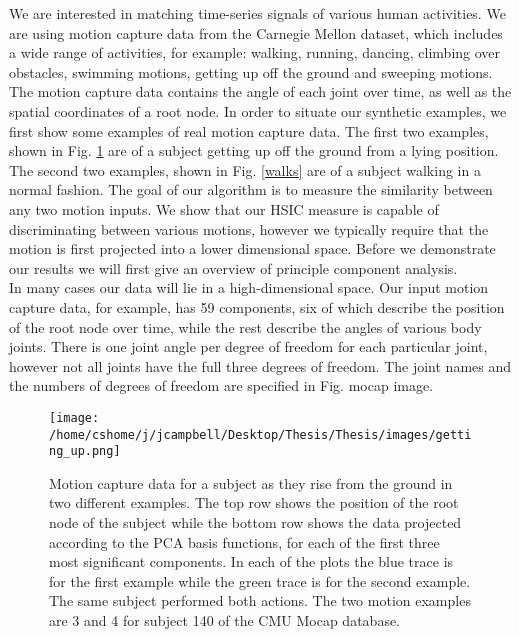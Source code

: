 We are interested in matching time-series signals of various human activities. We are using motion capture data from the Carnegie Mellon dataset, which includes a wide range of activities, for example: walking, running, dancing, climbing over obstacles, swimming motions, getting up off the ground and sweeping motions. The motion capture data contains the angle of each joint over time, as well as the spatial coordinates of a root node. In order to situate our synthetic examples, we first show some examples of real motion capture data. The first two examples, shown in Fig. \ref{getting_up} are of a subject getting up off the ground from a lying position. The second two examples, shown in Fig. \ref{walks} are of a subject walking in a normal fashion. The goal of our algorithm is to measure the similarity between any two motion inputs. We show that our HSIC measure is capable of discriminating between various motions, however we typically require that the motion is first projected into a lower dimensional space. Before we demonstrate our results we will first give an overview of principle component analysis.\\

In many cases our data will lie in a high-dimensional space. Our input motion capture data, for example, has 59 components, six of which describe the position of the root node over time, while the rest describe the angles of various body joints. There is one joint angle per degree of freedom for each particular joint, however not all joints have the full three degrees of freedom. The joint names and the numbers of degrees of freedom are specified in Fig. {mocap image}.\\

\begin{figure}[h]
\texttt{[image: /home/cshome/j/jcampbell/Desktop/Thesis/Thesis/images/getting\_up.png]}
\caption{Motion capture data for a subject as they rise from the ground in two 	different examples. The top row shows the position of the root node of the subject while the bottom row shows the data projected according to the PCA basis functions, for each of the first three most significant components. In each of the plots the blue trace is for the first example while the green trace is for the second example. The same subject performed both actions. The two motion examples are 3 and 4 for subject 140 of the CMU Mocap database. \label{getting_up}}
\end{figure}

